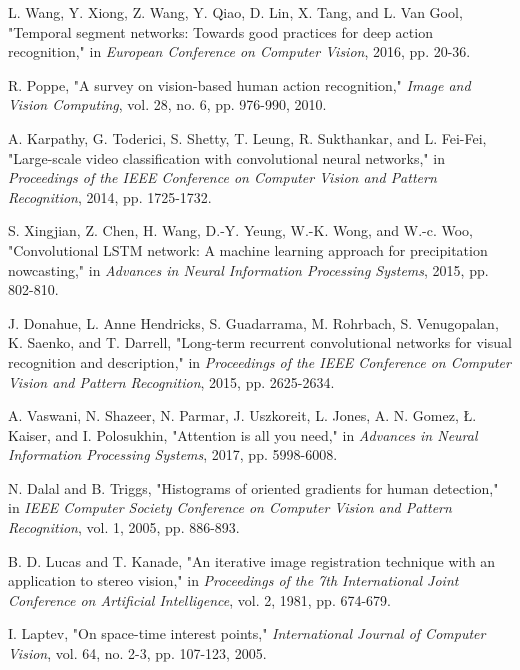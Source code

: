 \documentclass[twocolumn]{article}
\begin{document}

\begin{thebibliography}{99}

L. Wang, Y. Xiong, Z. Wang, Y. Qiao, D. Lin, X. Tang, and L. Van Gool, "Temporal segment networks: Towards good practices for deep action recognition," in \textit{European Conference on Computer Vision}, 2016, pp. 20-36.

R. Poppe, "A survey on vision-based human action recognition," \textit{Image and Vision Computing}, vol. 28, no. 6, pp. 976-990, 2010.

A. Karpathy, G. Toderici, S. Shetty, T. Leung, R. Sukthankar, and L. Fei-Fei, "Large-scale video classification with convolutional neural networks," in \textit{Proceedings of the IEEE Conference on Computer Vision and Pattern Recognition}, 2014, pp. 1725-1732.

S. Xingjian, Z. Chen, H. Wang, D.-Y. Yeung, W.-K. Wong, and W.-c. Woo, "Convolutional LSTM network: A machine learning approach for precipitation nowcasting," in \textit{Advances in Neural Information Processing Systems}, 2015, pp. 802-810.

J. Donahue, L. Anne Hendricks, S. Guadarrama, M. Rohrbach, S. Venugopalan, K. Saenko, and T. Darrell, "Long-term recurrent convolutional networks for visual recognition and description," in \textit{Proceedings of the IEEE Conference on Computer Vision and Pattern Recognition}, 2015, pp. 2625-2634.

A. Vaswani, N. Shazeer, N. Parmar, J. Uszkoreit, L. Jones, A. N. Gomez, Ł. Kaiser, and I. Polosukhin, "Attention is all you need," in \textit{Advances in Neural Information Processing Systems}, 2017, pp. 5998-6008.

N. Dalal and B. Triggs, "Histograms of oriented gradients for human detection," in \textit{IEEE Computer Society Conference on Computer Vision and Pattern Recognition}, vol. 1, 2005, pp. 886-893.

B. D. Lucas and T. Kanade, "An iterative image registration technique with an application to stereo vision," in \textit{Proceedings of the 7th International Joint Conference on Artificial Intelligence}, vol. 2, 1981, pp. 674-679.

I. Laptev, "On space-time interest points," \textit{International Journal of Computer Vision}, vol. 64, no. 2-3, pp. 107-123, 2005.


\end{thebibliography}
\end{document}
